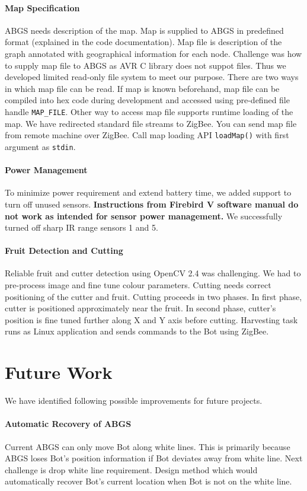 \documentclass[a4paper, 12pt]{article}
\begin{document}
 \paragraph{Map Specification}
 ABGS needs description of the map. Map is supplied to ABGS in predefined format (explained in the code documentation).
 Map file is description of the graph annotated with geographical information for each node. Challenge was how to
 supply map file to ABGS as AVR C library does not suppot files. Thus we developed limited read-only file system
 to meet our purpose. There are two ways in which map file can be read. If map is known beforehand, map file can 
 be compiled into hex code during development and accessed using pre-defined file handle \texttt{MAP\_FILE}.
 Other way to access map file supports runtime loading of the map. We have redirected standard file streams to 
 ZigBee. You can send map file from remote machine over ZigBee. Call map loading API \texttt{loadMap()} with first
 argument as \texttt{stdin}.

 \paragraph{Power Management}
 To minimize power requirement and extend battery time, we added support to turn off unused sensors. 
 \textbf{Instructions from Firebird V software manual \cite{fbswmanual} do not work as intended for sensor power 
 management.} We successfully turned off sharp IR range sensors 1 and 5.
 
 \paragraph{Fruit Detection and Cutting}
 Reliable fruit and cutter detection using OpenCV 2.4 was challenging. We had to pre-process image and fine tune
 colour parameters. Cutting needs correct positioning of the cutter and fruit. Cutting proceeds in two phases. In
 first phase, cutter is positioned approximately near the fruit. In second phase, cutter's position is fine tuned further
 along X and Y axis before cutting. Harvesting task runs as Linux application and sends commands to the Bot using
 ZigBee.
 
\section{Future Work}
We have identified following possible improvements for future projects.
\paragraph{Automatic Recovery of ABGS} Current ABGS can only move Bot along white lines. This is primarily
because ABGS loses Bot's position information if Bot deviates away from white line. Next challenge is drop white line
requirement. Design method which would automatically recover Bot's current location when Bot is not on the white line.
\end{document}
